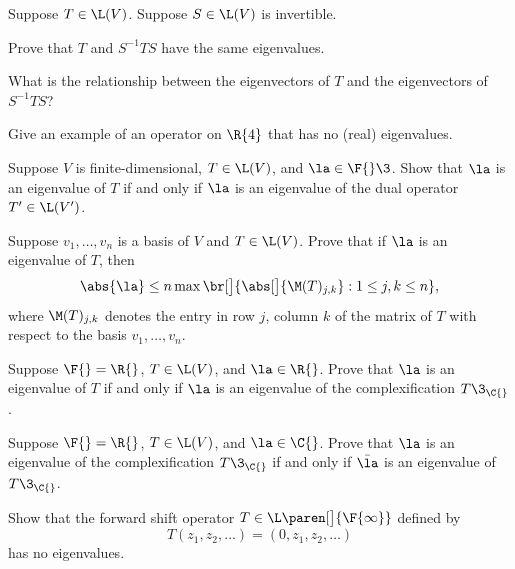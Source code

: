 \exercise
Suppose $T \in \L(V)$. Suppose $S \in \L(V)$ is invertible.
\begin{subtheorem}
\item
Prove that $T$ and $S^{-1} T S$ have the same eigenvalues.
\item
What is the relationship between the eigenvectors of $T$ and the eigenvectors of $S^{-1} T S$?
\end{subtheorem}
\exercisesubtheoremend


\exercise
Give an example of an operator on $\R{4}$ that has no (real) eigenvalues.


\exercise
Suppose $V$ is finite-dimensional, $T \in \L(V)$, and $\la \in \F{}\3$. Show that $\la$ is an eigenvalue of $T$ if and only if $\la$ is an eigenvalue of the dual operator $T' \in \L(V')$.\label{5eigdual}


\exercise
Suppose $v_1, \ldots, v_n$ is a basis of $V$ and $T \in \L(V)$. Prove that if $\la$ is an eigenvalue of $T$, then
\[
\abs{\la} \le n \max \br[\big]{ \abs[\big]{\M(T)_{j,k}} : 1 \le j, k \le n },
\]
where $\M(T)_{j,k}$ denotes the entry in row $j$, column $k$ of the matrix of $T$ with respect to the basis $v_1, \ldots, v_n$.

\exercise
Suppose $\F{} = \R{}$, $T \in \L(V)$, and $\la \in \R{}$. Prove that $\la$ is an eigenvalue of $T$ if and only if $\la$ is an eigenvalue of the complexification $T\3_{\C{}}$.\label{5realeig}


\exercise
Suppose $\F{} = \R{}$, $T \in \L(V)$, and $\la \in \C{}$. Prove that $\la$ is an eigenvalue of the complexification $T\3_{\C{}}$ if and only if $\bar{\la}$ is an eigenvalue of $T\3_{\C{}}$.\label{5TC}


\exercise
Show that the forward shift operator $T \in \L\paren[\big]{\F{\infty}}$ defined by
\[
T(z_1, z_2, \dots ) = (0, z_1, z_2, \dots )
\]
has no eigenvalues.


